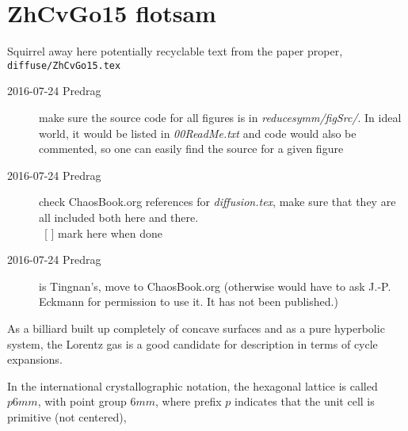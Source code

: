 
\section{ZhCvGo15 flotsam}
\label{s:flotsam}

Squirrel away here potentially recyclable text from the
paper proper, \texttt{diffuse/ZhCvGo15.tex}

\bigskip\bigskip
\begin{description}

\item[2016-07-24 Predrag]
    make sure the source code for all figures is in
    \emph{reducesymm/figSrc/}. In ideal world, it would be listed in
    \emph{00ReadMe.txt} and code would also be commented, so one can
    easily find the source for a given figure
\item[2016-07-24 Predrag]
    check ChaosBook.org references for \emph{diffusion.tex},
    make sure that they are all included both here and there.
    \\
    ~[ ] mark here when done

\item[2016-07-24 Predrag]
     is Tingnan's, move to ChaosBook.org
    (otherwise
	would have to ask J.-P. Eckmann for permission to use it. It has not been
	published.)


\end{description}
\bigskip\bigskip


%

As a billiard built up completely of concave surfaces and as a pure
hyperbolic system, the Lorentz gas is a good candidate for description in
terms of cycle expansions.


In the international crystallographic notation, the hexagonal lattice is
called $p6mm$, with point group $6mm$, where prefix $p$ indicates that
the unit cell is primitive (not centered),


